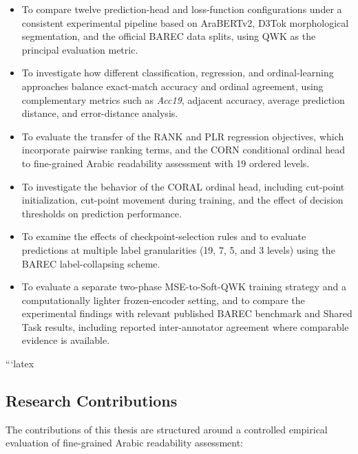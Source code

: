 \documentclass[12pt]{report}
\begin{document}
\begin{itemize}

    \item To compare twelve prediction-head and loss-function configurations under a consistent experimental pipeline based on AraBERTv2, D3Tok morphological segmentation, and the official BAREC data splits, using QWK as the principal evaluation metric.

    \item To investigate how different classification, regression, and ordinal-learning approaches balance exact-match accuracy and ordinal agreement, using complementary metrics such as \textit{Acc19}, adjacent accuracy, average prediction distance, and error-distance analysis.

    \item To evaluate the transfer of the RANK and PLR regression objectives, which incorporate pairwise ranking terms, and the CORN conditional ordinal head to fine-grained Arabic readability assessment with 19 ordered levels.

    \item To investigate the behavior of the CORAL ordinal head, including cut-point initialization, cut-point movement during training, and the effect of decision thresholds on prediction performance.

    \item To examine the effects of checkpoint-selection rules and to evaluate predictions at multiple label granularities (19, 7, 5, and 3 levels) using the BAREC label-collapsing scheme.

    \item To evaluate a separate two-phase MSE-to-Soft-QWK training strategy and a computationally lighter frozen-encoder setting, and to compare the experimental findings with relevant published BAREC benchmark and Shared Task results, including reported inter-annotator agreement where comparable evidence is available.

\end{itemize}



```latex
\subsection{Research Contributions}
\label{sec:research-contributions}

The contributions of this thesis are structured around a controlled empirical evaluation of fine-grained Arabic readability assessment:
\end{document}
